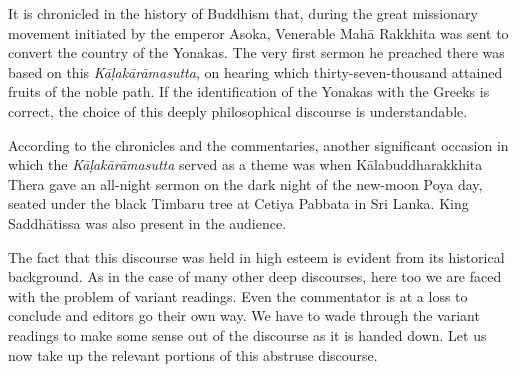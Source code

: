 It is chronicled in the history of Buddhism that, during the great missionary movement initiated by the emperor Asoka, Venerable Mahā Rakkhita was sent to convert the country of the Yonakas. The very first sermon he preached there was based on this \emph{Kāḷakārāmasutta}, on hearing which thirty-seven-thousand attained fruits of the noble path. If the identification of the Yonakas with the Greeks is correct, the choice of this deeply philosophical discourse is understandable.

According to the chronicles and the commentaries, another significant occasion in which the \emph{Kāḷakārāmasutta} served as a theme was when Kālabuddharakkhita Thera gave an all-night sermon on the dark night of the new-moon Poya day, seated under the black Timbaru tree at Cetiya Pabbata in Sri Lanka. King Saddhātissa was also present in the audience.

The fact that this discourse was held in high esteem is evident from its historical background. As in the case of many other deep discourses, here too we are faced with the problem of variant readings. Even the commentator is at a loss to conclude and editors go their own way. We have to wade through the variant readings to make some sense out of the discourse as it is handed down. Let us now take up the relevant portions of this abstruse discourse.

